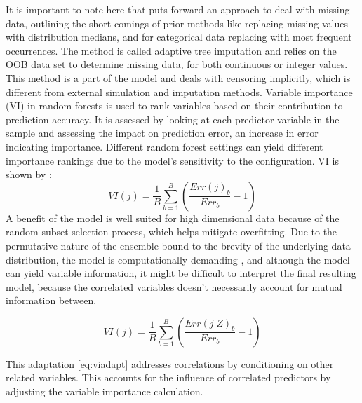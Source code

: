 \noindent It is important to note here that \parencite{ishwaran_random_2008} puts forward an approach to deal with missing data, outlining the short-comings of prior methods like replacing missing values with distribution medians, and for categorical data replacing with most frequent occurrences. The method is called adaptive tree imputation and relies on the OOB data set to determine missing data, for both continuous or integer values. This method is a part of the model and deals with censoring implicitly, which is different from external simulation and imputation methods. Variable importance (VI) \parencite{pham_springer_2023} in random forests is used to rank variables based on their contribution to prediction accuracy. It is assessed by looking at each predictor variable in the sample and assessing the impact on prediction error, an increase in error indicating importance. Different random forest settings can yield different importance rankings due to the model's sensitivity to the configuration. VI is shown by \parencite{pham_springer_2023}:
\begin{equation} \label{eq:vinorm}
VI(j) = \frac{1}{B}\sum_{b=1}^{B}(\frac{Err(j)_{b}}{Err_{b}}-1)
\end{equation}
\noindent A benefit of the model is well suited for high dimensional data because of the random subset selection process, which helps mitigate overfitting. Due to the permutative nature of the ensemble bound to the brevity of the underlying data distribution, the model is computationally demanding \parencite{pham_springer_2023}, and although the model can yield variable information, it might be difficult to interpret the final resulting model, because the correlated variables doesn't necessarily account for mutual information between.

\begin{equation} \label{eq:viadapt}VI(j) = \frac{1}{B}\sum_{b=1}^{B}(\frac{Err(j|Z)_{b}}{Err_{b}}-1)\end{equation}

\noindent This adaptation \ref{eq:viadapt} addresses correlations \parencite{pham_springer_2023} by conditioning on other related variables. This accounts for the influence of correlated predictors by adjusting the variable importance calculation.


